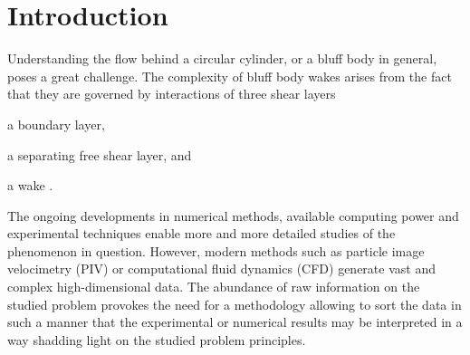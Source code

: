 \clearpage
\section{Introduction}
\label{sec:intro}
Understanding the flow behind a circular cylinder, or a bluff body in general, poses a great challenge. The complexity of bluff body wakes arises from the fact that they are governed by interactions of three shear layers
\begin{inparaenum}[(i)]
        \item a boundary layer,
        \item a separating free shear layer, and
        \item a wake \citep{williamson1996}. 
\end{inparaenum}


The ongoing developments in numerical methods, available computing power and experimental techniques enable more and more detailed studies of the phenomenon in question. However, modern methods such as particle image velocimetry (PIV) or computational fluid dynamics (CFD) generate vast and complex high-dimensional data. The abundance of raw information on the studied problem provokes the need for a methodology allowing to sort the data in {such} a manner {that} the experimental or numerical results may be interpreted in a way shadding light on the studied problem principles.

